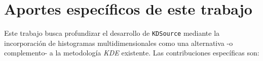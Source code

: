 


\section{Aportes específicos de este trabajo}

Este trabajo busca profundizar el desarrollo de \texttt{KDSource} mediante la incorporación de histogramas multidimensionales como una alternativa -o complemento- a la metodología \textit{KDE} existente. Las contribuciones específicas son:

